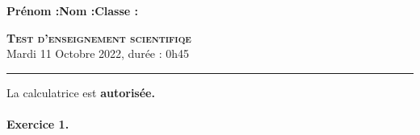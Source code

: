 \documentclass[11pt]{article}
\begin{document}

\noindent\textbf{Prénom :}\hfill\textbf{Nom :}\hfill\textbf{Classe :}\\[1cm]
\begin{center}
\textbf{\LARGE \textsc{Test d'enseignement scientifiqe}}\\[2mm]

{\large Mardi 11 Octobre 2022, durée : 0h45}\\[1mm]
\noindent\rule{12cm}{0.4pt}
\end{center}
La calculatrice est \textbf{autorisée.}

\paragraph{Exercice 1.}
\end{document}
